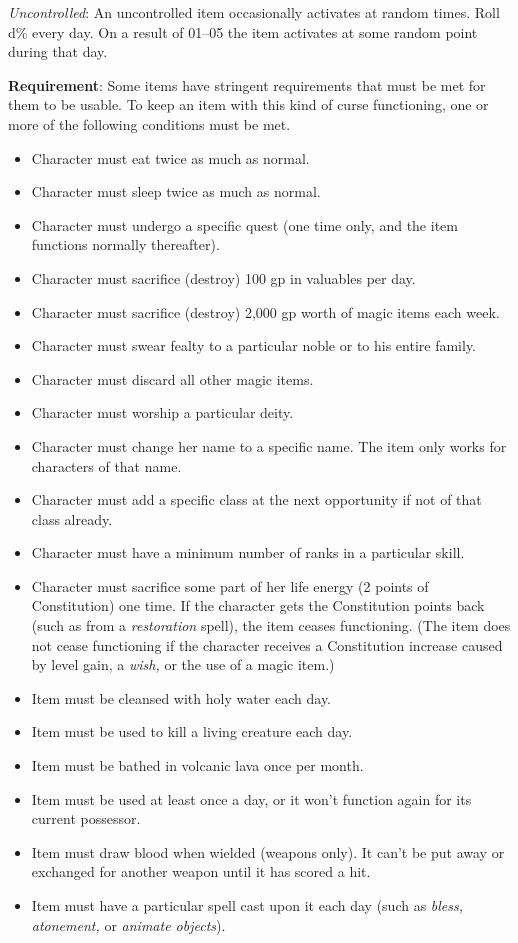 \textit{Uncontrolled}: An uncontrolled item occasionally activates at random times. Roll d\% every day. On a result of 01--05 the item activates at some random point during that day. 
				
\textbf{Requirement}: Some items have stringent requirements that must be met for them to be usable. To keep an item with this kind of curse functioning, one or more of the following conditions must be met.
				\begin{itemize}\item  Character must eat twice as much as normal.
				\item  Character must sleep twice as much as normal.
				\item  Character must undergo a specific quest (one time only, and the item functions normally thereafter).
				\item  Character must sacrifice (destroy) 100 gp in valuables per day.
				\item  Character must sacrifice (destroy) 2,000 gp worth of magic items each week.
				\item  Character must swear fealty to a particular noble or to his entire family.
				\item  Character must discard all other magic items.
				\item  Character must worship a particular deity.
				\item  Character must change her name to a specific name. The item only works for characters of that name.
				\item  Character must add a specific class at the next opportunity if not of that class already.
				\item  Character must have a minimum number of ranks in a particular skill.
				\item  Character must sacrifice some part of her life energy (2 points of Constitution) one time. If the character gets the Constitution points back (such as from a \textit{restoration }spell), the item ceases functioning. (The item does not cease functioning if the character receives a Constitution increase caused by level gain, a \textit{wish, }or the use of a magic item.)
				\item  Item must be cleansed with holy water each day.
				\item  Item must be used to kill a living creature each day.
				\item  Item must be bathed in volcanic lava once per month.
				\item  Item must be used at least once a day, or it won't function again for its current possessor.
				\item  Item must draw blood when wielded (weapons only). It can't be put away or exchanged for another weapon until it has scored a hit.
				\item  Item must have a particular spell cast upon it each day (such as \textit{bless, atonement, }or \textit{animate objects}).
\end{itemize}
				
